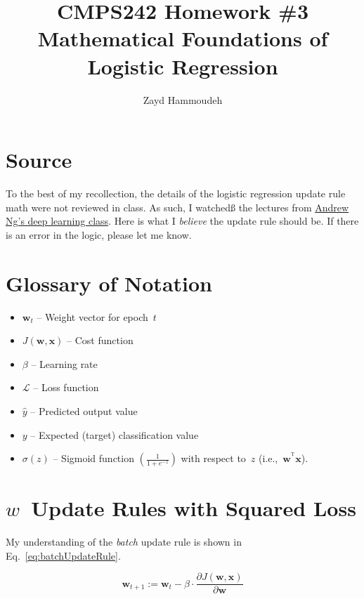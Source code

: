 \documentclass{report}
\title{\textbf{CMPS242 Homework \#3 \textendash{} Mathematical Foundations of Logistic Regression}}
\author{Zayd Hammoudeh}
\newcommand{\yhat}{\hat{y}}
\newcommand{\T}{^\textrm{T}}
\begin{document}

  \section{Source}
  
  To the best of my recollection, the details of the logistic regression update rule math were not reviewed in class.  As such, I watchedß the lectures from \href{https://www.coursera.org/learn/neural-networks-deep-learning/home/week/2}{\color{purple} Andrew Ng's deep learning class}.  Here is what I \textit{believe} the update rule should be.  If there is an error in the logic, please let me know.
  
  \section{Glossary of Notation}
  
  \begin{itemize}
    \item $\mathbf{w}_{t}$ -- Weight vector for epoch~$t$
    \item $J(\mathbf{w},\mathbf{x})$ -- Cost function
    \item $\beta$ -- Learning rate
    \item $\mathcal{L}$ -- Loss function
    \item $\yhat$ -- Predicted output value
    \item $y$ -- Expected (target) classification value
    \item $\sigma(z)$ -- Sigmoid function ${\left(\frac{1}{1+e^{-z}}\right)}$ with respect to~$z$ (i.e.,~${\mathbf{w}^{\T} \mathbf{x}}$).
  \end{itemize}
  
  \section{$w$~Update Rules with Squared Loss}
  
  My understanding of the \textit{batch} update rule is shown in Eq.~\eqref{eq:batchUpdateRule}.
  
  \begin{equation}
    \mathbf{w}_{t+1} := \mathbf{w}_{t} - \beta \cdot \frac{\partial J(\mathbf{w}, \mathbf{x})}{\partial \mathbf{w}}
    \label{eq:batchUpdateRule}
  \end{equation}
  
\end{document}
